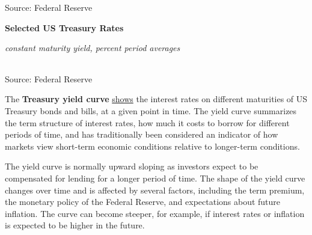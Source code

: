 \documentclass{report}
\newcommand{\tbllink}[1]{\href{https://raw.githubusercontent.com/bdecon/US-chartbook/master/chartbook/data/#1}{\faTable}}
\begin{document}
{\begin{minipage}{0.98\textwidth}
\footnotesize{Source: Federal Reserve} \hfill \tbllink{rates.csv}
\vspace{3mm}

\normalsize \textbf{Selected US Treasury Rates}\\
\footnotesize{\textit{constant maturity yield, percent \hspace{18mm}period averages}\\
\hspace*{-3mm}  \setlength{\tabcolsep}{2.0pt} \color{black!90}
		{\renewcommand{\arraystretch}{1.55}
\begin{tabular}{p{17mm} R{10.2mm} R{10.2mm} R{10.2mm} R{9.5mm}
		 		 R{9.5mm} R{9.5mm} R{9.5mm} R{9.5mm} R{9.5mm}}
			  \hline
		\end{tabular}}}

\vspace{-2mm}		
\footnotesize{Source: Federal Reserve}
\end{minipage}
\newpage
\begin{minipage}{0.76\textwidth}  
\small The \textbf{Treasury yield curve} \href{https://www.treasury.gov/resource-center/data-chart-center/interest-rates/Pages/TextView.aspx?data=yield}{shows} the interest rates on different maturities of US Treasury bonds and bills, at a given point in time. The yield curve summarizes the term structure of interest rates, how much it costs to borrow for different periods of time, and has traditionally been considered an indicator of how markets view short-term economic conditions relative to longer-term conditions. 

The yield curve is normally upward sloping as investors expect to be compensated for lending for a longer period of time. The shape of the yield curve changes over time and is affected by several factors, including the term premium, the monetary policy of the Federal Reserve, and expectations about future inflation. The curve can become steeper, for example, if interest rates or inflation is expected to be higher in the future. 
\end{minipage}
\vspace{1mm}

}
\end{document}
